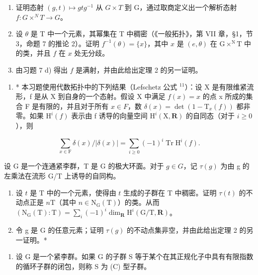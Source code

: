 \begin{enumerate}
\def\labelenumi{\alph{enumi})}
\item
  证明态射 \((g, t) \mapsto gtg^{-1}\) 从 \(G \times T\) 到 G，通过取商定义出一个解析态射 \(f : G \times^{N} T \to G\)。
\item
  设 \(\theta\) 是 T 中一个元素，其幂集在 T 中稠密（《一般拓扑》，第 VII 章，§1，节 3，命题 7 的推论 2）。证明 \(f^{-1}(\theta) = \{x\}\)，其中 \(x\) 是 \((e,\theta)\) 在 \(\mathrm{G} \times^{\mathrm{N}}\mathrm{T}\) 中的类，并且 \(f\) 在 \(x\) 处无分歧。
\item
  由习题 7 d) 得出 \(f\) 是满射，并由此给出定理 2 的另一证明。
\end{enumerate}

\begin{enumerate}
\def\labelenumi{\arabic{enumi})}
\setcounter{enumi}{9}
\tightlist
\item
  * 本习题使用代数拓扑中的下列结果（Lefschetz 公式 \(^{11}\)）：设 X 是有限维紧流形，f 是从 X 到自身的一个态射。假设 X 中满足 \(f(x) = x\) 的点 x 所成的集合 F 是有限的，并且对于所有 \(x \in F\)，数 \(\delta(x) = \det(1 - \mathrm{T}_{x}(f))\) 都非零。如果 \(\mathrm{H}^{i}(f)\) 表示由 f 诱导的向量空间 \(\mathrm{H}^{i}(\mathrm{X}, \mathbf{R})\) 的自同态（对于 \(i \geq 0\)），则
\end{enumerate}

\[
\sum_ {x \in \mathrm{F}} \delta (x) / | \delta (x) | = \sum_ {i \geq 0} (- 1) ^ {i} \operatorname{Tr} \mathrm{H} ^ {i} (f).
\]

设 G 是一个连通紧李群，T 是 G 的极大环面。对于 \(g \in G\)，记 \(\tau(g)\) 为由 g 的左乘法在流形 G/T 上诱导的自同构。

\begin{enumerate}
\def\labelenumi{\alph{enumi})}
\item
  设 \(t\) 是 \(\mathrm{T}\) 中的一个元素，使得由 \(t\) 生成的子群在 \(\mathrm{T}\) 中稠密。证明 \(\tau(t)\) 的不动点正是 \(n\mathrm{T}\)（其中 \(n \in \mathrm{N}_{\mathrm{G}}(\mathrm{T})\)）的类。从而 \((\mathrm{N}_{\mathrm{G}}(\mathrm{T}):\mathrm{T}) = \sum_{i}(-1)^{i}\dim_{\mathbf{R}}\mathrm{H}^{i}(\mathrm{G / T},\mathbf{R})\)。
\item
  令 g 是 G 的任意元素；证明 \(\tau(g)\) 的不动点集非空，并由此给出定理 2 的另一证明。*
\end{enumerate}

\begin{enumerate}
\def\labelenumi{\arabic{enumi})}
\setcounter{enumi}{10}
\tightlist
\item
  设 G 是一个紧李群。如果 G 的子群 S 等于某个在其正规化子中具有有限指数的循环子群的闭包，则称 S 为 (C) 型子群。
\end{enumerate}

